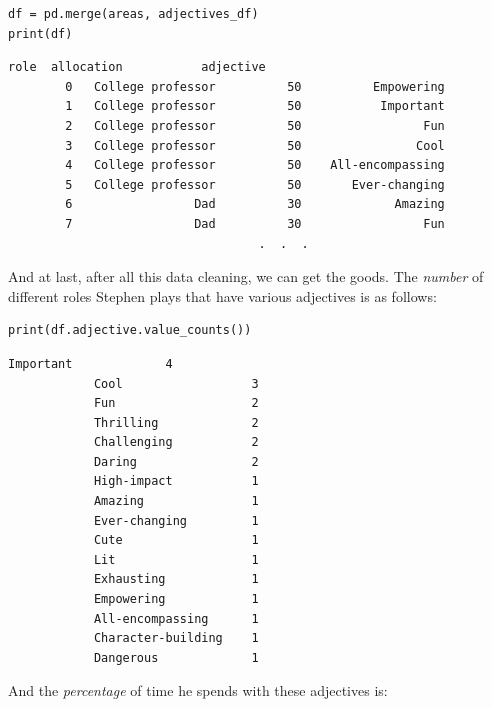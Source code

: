 \label{roles_df}

\begin{Verbatim}[fontsize=\small,samepage=true,frame=single,framesep=3mm]
df = pd.merge(areas, adjectives_df)
print(df)
\end{Verbatim}
\vspace{-.2in}

\begin{Verbatim}[fontsize=\footnotesize,samepage=true,frame=leftline,framesep=5mm,framerule=1mm]
                         role  allocation           adjective
        0   College professor          50          Empowering
        1   College professor          50           Important
        2   College professor          50                 Fun
        3   College professor          50                Cool
        4   College professor          50    All-encompassing
        5   College professor          50       Ever-changing
        6                 Dad          30             Amazing
        7                 Dad          30                 Fun
                                   .  .  .
\end{Verbatim}

And at last, after all this data cleaning, we can get the goods. The
\textit{number} of different roles Stephen plays that have various adjectives
is as follows:

\begin{Verbatim}[fontsize=\footnotesize,samepage=true,frame=single,framesep=3mm]
print(df.adjective.value_counts())
\end{Verbatim}
\vspace{-.2in}

\begin{Verbatim}[fontsize=\scriptsize,samepage=true,frame=leftline,framesep=5mm,framerule=1mm]
            Important             4
            Cool                  3
            Fun                   2
            Thrilling             2
            Challenging           2
            Daring                2
            High-impact           1
            Amazing               1
            Ever-changing         1
            Cute                  1
            Lit                   1
            Exhausting            1
            Empowering            1
            All-encompassing      1
            Character-building    1
            Dangerous             1
\end{Verbatim}

And the \textit{percentage} of time he spends with these adjectives is:

